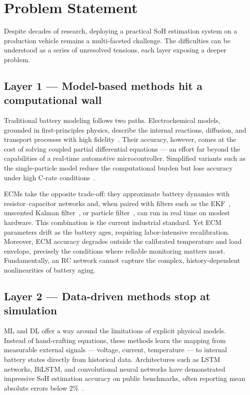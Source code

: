 \section{Problem Statement}

Despite decades of research, deploying a practical SoH estimation system on a production vehicle remains a multi-faceted challenge. The difficulties can be understood as a series of unresolved tensions, each layer exposing a deeper problem.

\subsection*{Layer 1 --- Model-based methods hit a computational wall}

Traditional battery modeling follows two paths. Electrochemical models, grounded in first-principles physics, describe the internal reactions, diffusion, and transport processes with high fidelity~\autocite{doyle1993}. Their accuracy, however, comes at the cost of solving coupled partial differential equations — an effort far beyond the capabilities of a real-time automotive microcontroller. Simplified variants such as the single-particle model reduce the computational burden but lose accuracy under high C-rate conditions~\autocite{santhanagopalan2006}.

\glspl{ECM} take the opposite trade-off: they approximate battery dynamics with resistor--capacitor networks and, when paired with filters such as the \gls{EKF}~\autocite{ECM_EKF}, unscented Kalman filter~\autocite{ECM_UKF}, or particle filter~\autocite{ECM_PF}, can run in real time on modest hardware. This combination is the current industrial standard. Yet ECM parameters drift as the battery ages, requiring labor-intensive recalibration. Moreover, ECM accuracy degrades outside the calibrated temperature and load envelope, precisely the conditions where reliable monitoring matters most. Fundamentally, an RC network cannot capture the complex, history-dependent nonlinearities of battery aging.

\subsection*{Layer 2 --- Data-driven methods stop at simulation}

\gls{ML} and \gls{DL} offer a way around the limitations of explicit physical models. Instead of hand-crafting equations, these methods learn the mapping from measurable external signals — voltage, current, temperature — to internal battery states directly from historical data. Architectures such as \gls{LSTM} networks, \gls{BiLSTM}, and convolutional neural networks have demonstrated impressive SoH estimation accuracy on public benchmarks, often reporting mean absolute errors below 2\%~\autocite{Nozarijouybari2024}.

